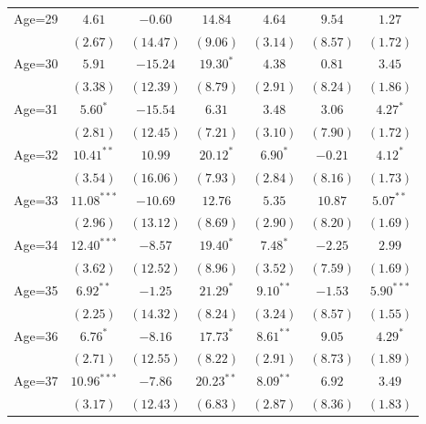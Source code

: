 \documentclass[fullpage]{paper}
\begin{document}
\begin{center}
\begin{longtable}{l c c c c c c }
Age=29      & $4.61$        & $-0.60$      & $14.84$       & $4.64$       & $9.54$        & $1.27$        \\
            & $(2.67)$      & $(14.47)$    & $(9.06)$      & $(3.14)$     & $(8.57)$      & $(1.72)$      \\
Age=30      & $5.91$        & $-15.24$     & $19.30^{*}$   & $4.38$       & $0.81$        & $3.45$        \\
            & $(3.38)$      & $(12.39)$    & $(8.79)$      & $(2.91)$     & $(8.24)$      & $(1.86)$      \\
Age=31      & $5.60^{*}$    & $-15.54$     & $6.31$        & $3.48$       & $3.06$        & $4.27^{*}$    \\
            & $(2.81)$      & $(12.45)$    & $(7.21)$      & $(3.10)$     & $(7.90)$      & $(1.72)$      \\
Age=32      & $10.41^{**}$  & $10.99$      & $20.12^{*}$   & $6.90^{*}$   & $-0.21$       & $4.12^{*}$    \\
            & $(3.54)$      & $(16.06)$    & $(7.93)$      & $(2.84)$     & $(8.16)$      & $(1.73)$      \\
Age=33      & $11.08^{***}$ & $-10.69$     & $12.76$       & $5.35$       & $10.87$       & $5.07^{**}$   \\
            & $(2.96)$      & $(13.12)$    & $(8.69)$      & $(2.90)$     & $(8.20)$      & $(1.69)$      \\
Age=34      & $12.40^{***}$ & $-8.57$      & $19.40^{*}$   & $7.48^{*}$   & $-2.25$       & $2.99$        \\
            & $(3.62)$      & $(12.52)$    & $(8.96)$      & $(3.52)$     & $(7.59)$      & $(1.69)$      \\
Age=35      & $6.92^{**}$   & $-1.25$      & $21.29^{*}$   & $9.10^{**}$  & $-1.53$       & $5.90^{***}$  \\
            & $(2.25)$      & $(14.32)$    & $(8.24)$      & $(3.24)$     & $(8.57)$      & $(1.55)$      \\
Age=36      & $6.76^{*}$    & $-8.16$      & $17.73^{*}$   & $8.61^{**}$  & $9.05$        & $4.29^{*}$    \\
            & $(2.71)$      & $(12.55)$    & $(8.22)$      & $(2.91)$     & $(8.73)$      & $(1.89)$      \\
Age=37      & $10.96^{***}$ & $-7.86$      & $20.23^{**}$  & $8.09^{**}$  & $6.92$        & $3.49$        \\
            & $(3.17)$      & $(12.43)$    & $(6.83)$      & $(2.87)$     & $(8.36)$      & $(1.83)$      \\

\end{longtable}
\end{center}
\end{document}
